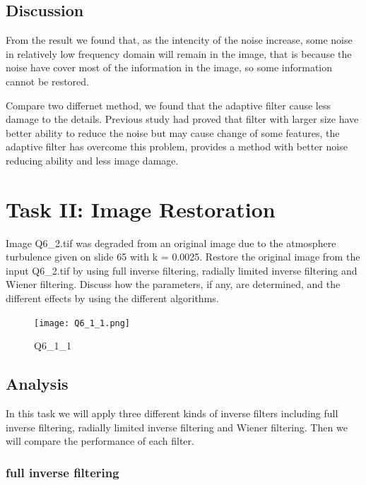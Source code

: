 \documentclass[
	12pt, %
]{style/fphw}
\begin{document}
	\subsection*{Discussion}

	From the result we found that, as the intencity of the noise increase, some noise in relatively low frequency domain will remain in the image, that is because the noise have cover most of the information in the image, so some information cannot be restored. 

	Compare two differnet method, we found that the adaptive filter cause less damage to the details. Previous study had proved that filter with larger size have better ability to reduce the noise but may cause change of some features, the adaptive filter has overcome this problem, provides a method with better noise reducing ability and less image damage.
	

\section*{Task II: Image Restoration}

\begin{problem}
	Image Q6\_2.tif was degraded from an original image due to the atmosphere turbulence given on slide 65 with k = 0.0025. Restore the original image from the input Q6\_2.tif by using full inverse filtering, radially limited inverse filtering and Wiener filtering. Discuss how the parameters, if any, are determined, and the different effects by using the different algorithms.

	\begin{figure}[H]
		\centering
	    \texttt{[image: Q6\_1\_1.png]}
	    \caption{Q6\_1\_1}
	    \label{Q6_1_1}
	\end{figure}
\end{problem}

\subsection*{Analysis}

In this task we will apply three different kinds of inverse filters including full inverse filtering, radially limited inverse filtering and Wiener filtering. Then we will compare the performance of each filter. 

\subsubsection*{full inverse filtering}
\end{document}
